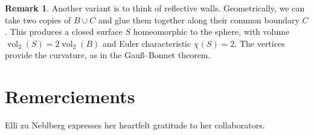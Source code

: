 \documentclass[a4paper]{amsart}
\numberwithin{equation}{section}
\theoremstyle{plain}
\theoremstyle{definition}
\newtheorem{remark}[theorem]{Remark}
\DeclareMathOperator{\vol}{vol}
\begin{document}
\begin{remark}
  Another variant is to think of reflective walls.
  Geometrically, we can take two copies of $B \cup C$
  and glue them together along their common boundary $C$.
  This produces a closed surface $S$ homeomorphic to the sphere,
  with volume $\vol_2(S) = 2 \vol_2(B)$ and Euler characteristic $\chi(S) = 2$.
  The vertices provide the curvature, as in the Gauß--Bonnet theorem.
\end{remark}




\section*{Remerciements}

Elli zu Neblberg expresses her heartfelt gratitude to her collaborators.


\end{document}
